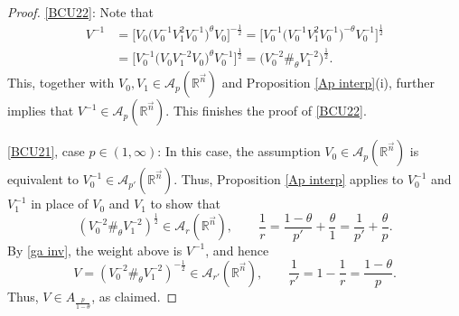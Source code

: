 \documentclass[11pt, reqno]{amsart}
\theoremstyle{definition}
\theoremstyle{remark}
\numberwithin{equation}{section}
\newcommand{\A}{\mathscr A}
\newcommand{\R}{\mathbb R}
\newcommand{\vn}{\vec n}
\begin{document}
\begin{proof}
\eqref{BCU22}: Note that
\begin{equation}\label{ga inv}
\begin{split}
V^{-1}
&=\Big[V_0\Big(V_0^{-1}V_1^2V_0^{-1}\Big)^\theta V_0\Big]^{-\frac12}
=\Big[V_0^{-1}\Big(V_0^{-1}V_1^2V_0^{-1}\Big)^{-\theta} V_0^{-1}\Big]^{\frac12}\\
&=\Big[V_0^{-1}\Big(V_0V_1^{-2}V_0\Big)^{\theta} V_0^{-1}\Big]^{\frac12}
=\Big(V_0^{-2}\#_\theta V_1^{-2}\Big)^{\frac12}.
\end{split}
\end{equation}
This, together with $V_0,V_1\in \A_p(\R^{\vn})$ and
Proposition \ref{Ap interp}(i), further implies that $V^{-1}\in\A_p(\R^{\vn})$.
This finishes the proof of \eqref{BCU22}.

\eqref{BCU21}, case $p\in(1,\infty)$: In this case, the assumption $V_0\in\A_p(\R^{\vn})$ is equivalent to $V_0^{-1}\in \A_{p'}(\R^{\vn})$. Thus, Proposition \ref{Ap interp} applies to $V_0^{-1}$ and $V_1^{-1}$ in place of $V_0$ and $V_1$ to show that
\begin{equation*}
  (V_0^{-2}\#_\theta V_1^{-2})^{\frac12}\in\A_r(\R^{\vn}),\qquad
  \frac{1}{r}=\frac{1-\theta}{p'}+\frac{\theta}{1}=\frac{1}{p'}+\frac{\theta}{p}.
\end{equation*}
By \eqref{ga inv}, the weight above is $V^{-1}$, and hence
\begin{equation*}
  V=(V_0^{-2}\#_\theta V_1^{-2})^{-\frac12}\in \A_{r'}(\R^{\vn}),\qquad
  \frac{1}{r'}=1-\frac{1}{r}=\frac{1-\theta}{p}.
\end{equation*}
Thus, $V\in A_{\frac{p}{1-\theta}}$, as claimed.


\end{proof}
\end{document}
